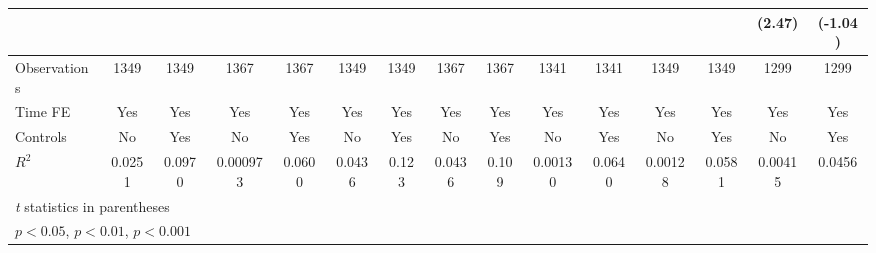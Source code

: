{\begin{tabular}{l*{14}{c}}
                &                  &                  &                  &                  &                  &                  &                  &                  &                  &                  &                  &                  &   (2.47)         &  (-1.04)         \\
\hline
Observations    &     1349         &     1349         &     1367         &     1367         &     1349         &     1349         &     1367         &     1367         &     1341         &     1341         &     1349         &     1349         &     1299         &     1299         \\
Time FE         &      Yes         &      Yes         &      Yes         &      Yes         &      Yes         &      Yes         &      Yes         &      Yes         &      Yes         &      Yes         &      Yes         &      Yes         &      Yes         &      Yes         \\
Controls        &       No         &      Yes         &       No         &      Yes         &       No         &      Yes         &       No         &      Yes         &       No         &      Yes         &       No         &      Yes         &       No         &      Yes         \\
$ R^2 $         &   0.0251         &   0.0970         & 0.000973         &   0.0600         &   0.0436         &    0.123         &   0.0436         &    0.109         &  0.00130         &   0.0640         &  0.00128         &   0.0581         &  0.00415         &   0.0456         \\
\hline\hline
\multicolumn{15}{l}{\footnotesize \textit{t} statistics in parentheses}\\
\multicolumn{15}{l}{\footnotesize \sym{*} \(p<0.05\), \sym{**} \(p<0.01\), \sym{***} \(p<0.001\)}\\
\end{tabular}
}
